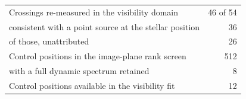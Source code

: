 \begin{tabular}{@{}lr@{}}
\hline
Crossings re-measured in the visibility domain & 46 of 54 \\
\quad consistent with a point source at the stellar position & 36 \\
\quad of those, unattributed & 26 \\
\hline
Control positions in the image-plane rank screen & 512 \\
\quad with a full dynamic spectrum retained & 8 \\
Control positions available in the visibility fit & 12 \\
\hline
\end{tabular}
